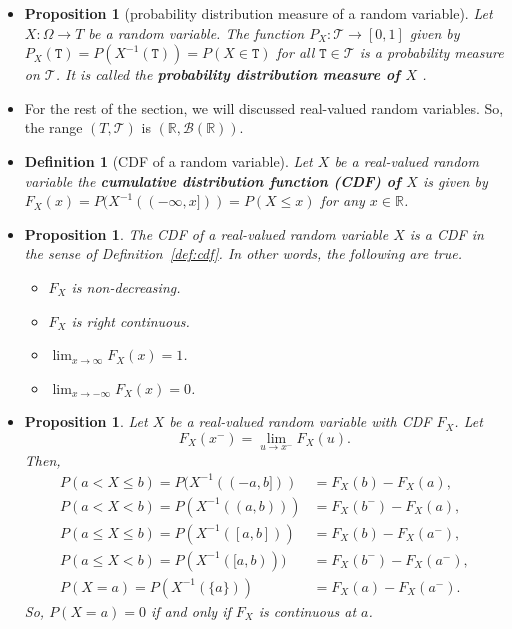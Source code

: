 \documentclass[10pt]{article}
\newtheorem{definition}[lemma]{Definition}
\newtheorem{proposition}[lemma]{Proposition}
\numberwithin{lemma}{section}
\newcommand{\mcal}[1]{\mathcal{#1}}
\newcommand{\Real}{\mathbb{R}}
\begin{document}
\begin{itemize}
  \item \begin{proposition}[probability distribution measure of a random variable] \label{thm:probability-distribution-measure}
    Let $X: \Omega \rightarrow T$ be a random variable. The function $P_X: \mcal{T} \rightarrow [0,1]$ given by $P_X(\mathtt{T}) = P(X^{-1}(\mathtt{T})) = P(X \in \mathtt{T})$ for all $\mathtt{T} \in \mcal{T}$ is a probability measure on $\mcal{T}$. It is called the {\bf probability distribution measure of $X$} .
  \end{proposition}


  \item For the rest of the section, we will discussed real-valued random variables. So, the range $(T,\mcal{T})$ is $(\Real, \mcal{B}(\Real))$.
  
  \item \begin{definition}[CDF of a random variable]
    Let $X$ be a real-valued random variable the {\bf cumulative distribution function (CDF) of $X$} is given by $F_X(x) = P(X^{-1}((-\infty, x])) = P(X \leq x)$ for any $x \in \Real$.
  \end{definition}

  \item \begin{proposition}
    The CDF of a real-valued random variable $X$ is a CDF in the sense of Definition~\ref{def:cdf}. In other words, the following are true.
    \begin{itemize}
      \item $F_X$ is non-decreasing.
      \item $F_X$ is right continuous.
      \item $\lim_{x \rightarrow \infty} F_X(x) = 1$.
      \item $\lim_{x \rightarrow -\infty} F_X(x) = 0$.
    \end{itemize}  
  \end{proposition}

  \item \begin{proposition}
    Let $X$ be a real-valued random variable with CDF $F_X$. Let $$F_X(x^-) = \lim_{u \rightarrow x^-} F_X(u).$$ Then,
    \begin{align*}
      P(a < X \leq b) = P(X^{-1}((-a, b])) &= F_X(b) - F_X(a), \\
      P(a < X < b) = P(X^{-1}((a,b))) &= F_X(b^-) - F_X(a), \\
      P(a \leq X \leq b) = P(X^{-1}([a,b])) &= F_X(b) - F_X(a^-), \\
      P(a \leq X < b) = P(X^{-1}([a,b))) &= F_X(b^-) - F_X(a^-), \\
      P(X = a) = P(X^{-1}(\{a\})) &= F_X(a) - F_X(a^-).
    \end{align*}
    So, $P(X = a) = 0$ if and only if $F_X$ is continuous at $a$.
  \end{proposition}
\end{itemize}
\end{document}
